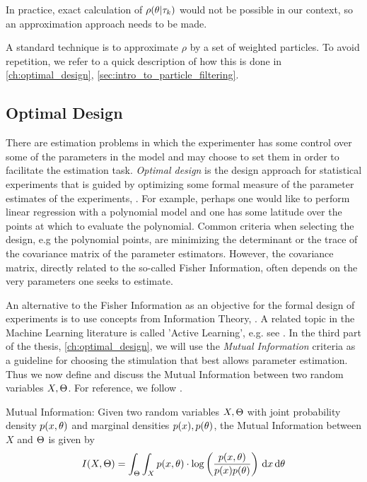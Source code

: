 In practice, exact calculation of $\rho({ \theta}|{\tau}_k)$ would not be possible in our
context, so an approximation approach needs to be made. 

A standard technique is to approximate $\rho$ by a set of weighted particles. To
avoid repetition, we refer to a quick description of how this is done in
\cref{ch:optimal_design}, \cref{sec:intro_to_particle_filtering}.
 
\subsection{Optimal Design}
\label{sec:optimal_design}
There are estimation problems in which the experimenter has some control over some 
of the parameters in the model and may choose to set them in order to facilitate the
estimation task. {\sl Optimal design} is the design approach for statistical
experiments that is guided by optimizing some formal measure of the parameter estimates of the experiments, \cite{Pukelsheim2006}. For example, perhaps one would like to
perform linear regression with a polynomial model and one has some latitude over the points at which to evaluate the polynomial. Common criteria when selecting the
design, e.g the polynomial points, are minimizing the determinant or the trace
of the covariance matrix of the parameter estimators. However, the covariance matrix, directly related to the so-called Fisher Information, often depends on the very 
parameters one seeks to estimate.

An alternative to the Fisher Information as an objective for the formal design
of experiments is to use concepts from Information Theory, \cite{MacKay2003}.
A related topic in the Machine Learning literature is called 'Active Learning',
e.g. see \cite{Cohn1996,Settles2010,Seeger2008}. In the third part of the
thesis, \cref{ch:optimal_design}, we will use the {\sl Mutual Information}
criteria as a guideline for choosing the stimulation that best allows parameter
estimation. Thus we now define and discuss the Mutual Information between two
random variables $X, {\Theta}$. For reference, we follow \cite{MacKay2003}.

\begin{defn}Mutual Information:
Given two random variables $X,{\Theta}$ with joint probability density
$p(x,{ \theta})$ and marginal densities $p(x), p({ \theta})$, the Mutual Information between
$X$ and ${\Theta}$ is given by
\begin{equation}
I(X,\Theta) = \int_\Theta \int_X p(x,{ \theta}) \cdot \log \left(
\frac{p(x,{ \theta})}{p(x)p({ \theta})}\right) \, \mathrm{d} x \, \mathrm{d} { \theta}
\label{eq:mutual_info_defn}
\end{equation}
\end{defn}

